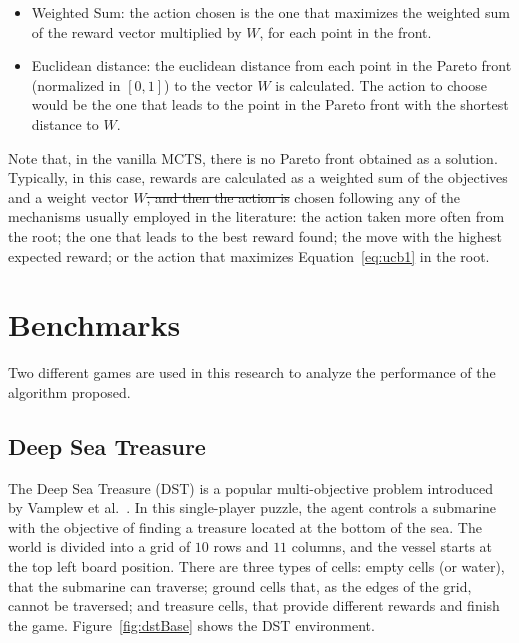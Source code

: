 \documentclass[journal]{IEEEtran}
\providecommand{\DIFaddtex}[1]{{\protect\color{blue}\uwave{#1}}} %
\providecommand{\DIFdeltex}[1]{{\protect\color{red}\sout{#1}}}                      %
\providecommand{\DIFaddbegin}{} %
\providecommand{\DIFaddend}{} %
\providecommand{\DIFdelbegin}{} %
\providecommand{\DIFdelend}{} %
\providecommand{\DIFadd}[1]{\texorpdfstring{\DIFaddtex{#1}}{#1}} %
\providecommand{\DIFdel}[1]{\texorpdfstring{\DIFdeltex{#1}}{}} %
\begin{document}
\begin{itemize}
\item Weighted Sum: the action chosen is the one that maximizes the weighted sum of the reward vector multiplied by $W$, for each point in the front.
\item Euclidean distance: the euclidean distance from each point in the Pareto front \DIFaddbegin \DIFadd{approximation }\DIFaddend (normalized in $[0,1]$) to the vector $W$ is calculated. The action to choose would be the one that leads to the point in the Pareto front with the shortest distance to $W$. 
\end{itemize}

Note that, in the vanilla MCTS, there is no Pareto front obtained as a solution. Typically, in this case, rewards are calculated as a weighted sum of the objectives and a weight vector $W$\DIFdelbegin \DIFdel{, and then the action is }\DIFdelend \DIFaddbegin \DIFadd{. The action is then }\DIFaddend chosen following any of the mechanisms usually employed in the literature: the action taken more often from the root; the one that leads to the best reward found; the move with the highest expected reward; or the action that maximizes Equation~\ref{eq:ucb1} in the root.

\section{Benchmarks} \label{sec:bench}

Two different games are used in this research to analyze the performance of the algorithm proposed.

\subsection{Deep Sea Treasure} \label{ssec:dst}

The Deep Sea Treasure (DST) is a popular multi-objective problem introduced by Vamplew et al.~\cite{Vamplew2010}. In this single-player puzzle, the agent controls a submarine with the objective of finding a treasure located at the bottom of the sea. The world is divided into a grid of $10$ rows and $11$ columns, and the vessel starts at the top left board position. There are three types of cells: empty cells (or water), that the submarine can traverse; ground cells that, as the edges of the grid, cannot be traversed; and treasure cells, that provide different rewards and finish the game. Figure~\ref{fig:dstBase} shows the DST environment.
\end{document}
